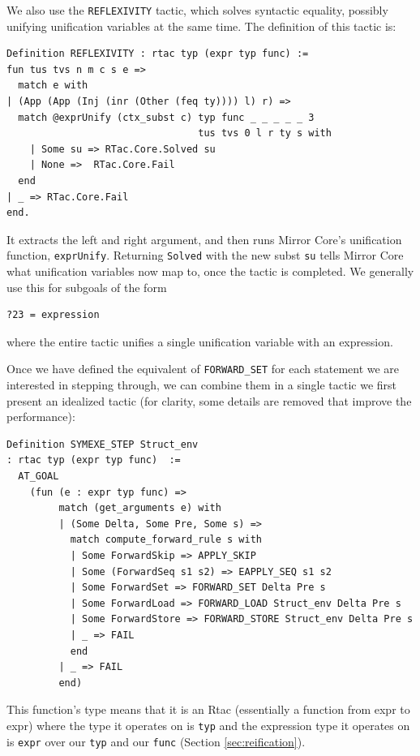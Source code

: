 \documentclass{puthesis}
\begin{document}
We also use the \lstinline|REFLEXIVITY| tactic, which solves syntactic
equality, possibly unifying unification variables at the same
time. The definition of this tactic is:

\begin{lstlisting}
Definition REFLEXIVITY : rtac typ (expr typ func) :=
fun tus tvs n m c s e => 
  match e with 
| (App (App (Inj (inr (Other (feq ty)))) l) r) =>
  match @exprUnify (ctx_subst c) typ func _ _ _ _ _ 3
                                 tus tvs 0 l r ty s with
    | Some su => RTac.Core.Solved su 
    | None =>  RTac.Core.Fail
  end
| _ => RTac.Core.Fail
end.
\end{lstlisting}

It extracts the left and right argument, and then runs Mirror Core's
unification function, \lstinline|exprUnify|. Returning
\lstinline|Solved| with the new subst \lstinline|su| tells Mirror Core
what unification variables now map to, once the tactic is completed.
We generally use this for subgoals of the form 

\begin{lstlisting}
?23 = expression
\end{lstlisting}

where the entire tactic unifies a single unification variable with an expression.

Once we have defined the equivalent of \lstinline|FORWARD_SET| for
each statement we are interested in stepping through, we can combine
them in a single tactic we first present an idealized tactic (for
clarity, some details are removed that improve the performance):

\begin{lstlisting}
Definition SYMEXE_STEP Struct_env
: rtac typ (expr typ func)  :=
  AT_GOAL
    (fun (e : expr typ func) => 
         match (get_arguments e) with
         | (Some Delta, Some Pre, Some s) =>  
           match compute_forward_rule s with
           | Some ForwardSkip => APPLY_SKIP
           | Some (ForwardSeq s1 s2) => EAPPLY_SEQ s1 s2 
           | Some ForwardSet => FORWARD_SET Delta Pre s
           | Some ForwardLoad => FORWARD_LOAD Struct_env Delta Pre s
           | Some ForwardStore => FORWARD_STORE Struct_env Delta Pre s
           | _ => FAIL
           end
         | _ => FAIL
         end)
\end{lstlisting}

This function's type means that it is an Rtac (essentially a function
from expr to expr) where the type it operates on is \lstinline|typ|
and the expression type it operates on is \lstinline|expr| over our
\lstinline|typ| and our \lstinline|func| (Section \ref{sec:reification}).
\end{document}
